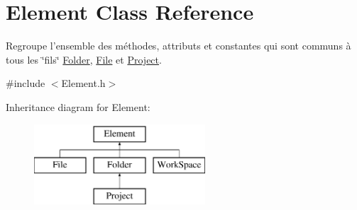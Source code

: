 \hypertarget{class_element}{
\section{Element Class Reference}
\label{class_element}
}


Regroupe l'ensemble des méthodes, attributs et constantes qui sont communs à tous les \char`\"{}fils\char`\"{} \hyperlink{class_folder}{Folder}, \hyperlink{class_file}{File} et \hyperlink{class_project}{Project}.  




{\ttfamily \#include $<$Element.h$>$}

Inheritance diagram for Element:\begin{figure}[H]
\begin{center}
\leavevmode
\includegraphics[height=3.000000cm]{class_element}
\end{center}
\end{figure}
